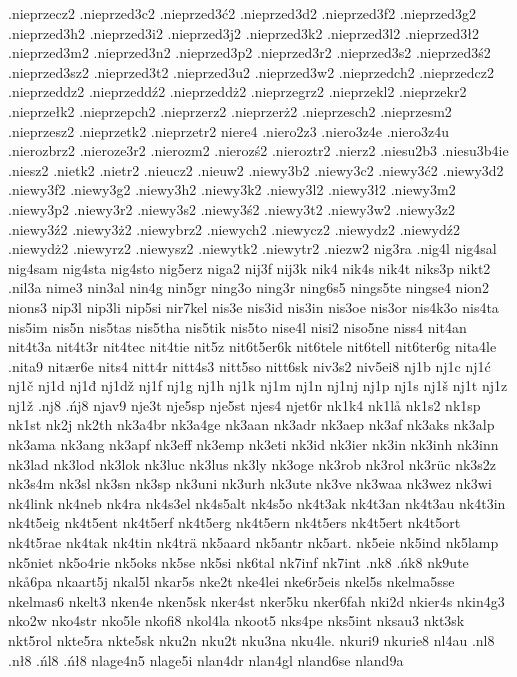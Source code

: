 {{.nieprzecz2
.nieprzed3c2
.nieprzed3ć2
.nieprzed3d2
.nieprzed3f2
.nieprzed3g2
.nieprzed3h2
.nieprzed3i2
.nieprzed3j2
.nieprzed3k2
.nieprzed3l2
.nieprzed3ł2
.nieprzed3m2
.nieprzed3n2
.nieprzed3p2
.nieprzed3r2
.nieprzed3s2
.nieprzed3ś2
.nieprzed3sz2
.nieprzed3t2
.nieprzed3u2
.nieprzed3w2
.nieprzedch2
.nieprzedcz2
.nieprzeddz2
.nieprzeddź2
.nieprzeddż2
.nieprzegrz2
.nieprzekl2
.nieprzekr2
.nieprzełk2
.nieprzepch2
.nieprzerz2
.nieprzerż2
.nieprzesch2
.nieprzesm2
.nieprzesz2
.nieprzetk2
.nieprzetr2
niere4
.niero2z3
.niero3z4e
.niero3z4u
.nierozbrz2
.nieroze3r2
.nierozm2
.nierozś2
.nieroztr2
.nierz2
.niesu2b3
.niesu3b4ie
.niesz2
.nietk2
.nietr2
.nieucz2
.nieuw2
.niewy3b2
.niewy3c2
.niewy3ć2
.niewy3d2
.niewy3f2
.niewy3g2
.niewy3h2
.niewy3k2
.niewy3l2
.niewy3ł2
.niewy3m2
.niewy3p2
.niewy3r2
.niewy3s2
.niewy3ś2
.niewy3t2
.niewy3w2
.niewy3z2
.niewy3ź2
.niewy3ż2
.niewybrz2
.niewych2
.niewycz2
.niewydz2
.niewydź2
.niewydż2
.niewyrz2
.niewysz2
.niewytk2
.niewytr2
.niezw2
nig3ra
.nig4l
nig4sal
nig4sam
nig4sta
nig4sto
nig5erz
niga2
nij3f
nij3k
nik4
nik4s
nik4t
niks3p
nikt2
.nil3a
nime3
nin3al
nin4g
nin5gr
ning3o
ning3r
ning6s5
nings5te
ningse4
nion2
nions3
nip3l
nip3li
nip5si
nir7kel
nis3e
nis3id
nis3in
nis3oe
nis3or
nis4k3o
nis4ta
nis5im
nis5n
nis5tas
nis5tha
nis5tik
nis5to
nise4l
nisi2
niso5ne
niss4
nit4an
nit4t3a
nit4t3r
nit4tec
nit4tie
nit5z
nit6t5er6k
nit6tele
nit6tell
nit6ter6g
nita4le
.nita9
nitær6e
nits4
nitt4r
nitt4s3
nitt5so
nitt6sk
niv3s2
niv5ei8
nj1b
nj1c
nj1ć
nj1č
nj1d
nj1đ
nj1dž
nj1f
nj1g
nj1h
nj1k
nj1m
nj1n
nj1nj
nj1p
nj1s
nj1š
nj1t
nj1z
nj1ž
.nj8
.ńj8
njav9
nje3t
nje5sp
nje5st
njes4
njet6r
nk1k4
nk1lå
nk1s2
nk1sp
nk1st
nk2j
nk2th
nk3a4br
nk3a4ge
nk3aan
nk3adr
nk3aep
nk3af
nk3aks
nk3alp
nk3ama
nk3ang
nk3apf
nk3eff
nk3emp
nk3eti
nk3id
nk3ier
nk3in
nk3inh
nk3inn
nk3lad
nk3lod
nk3lok
nk3luc
nk3lus
nk3ly
nk3oge
nk3rob
nk3rol
nk3rüc
nk3s2z
nk3s4m
nk3sl
nk3sn
nk3sp
nk3uni
nk3urh
nk3ute
nk3ve
nk3waa
nk3wez
nk3wi
nk4link
nk4neb
nk4ra
nk4s3el
nk4s5alt
nk4s5o
nk4t3ak
nk4t3an
nk4t3au
nk4t3in
nk4t5eig
nk4t5ent
nk4t5erf
nk4t5erg
nk4t5ern
nk4t5ers
nk4t5ert
nk4t5ort
nk4t5rae
nk4tak
nk4tin
nk4trä
nk5aard
nk5antr
nk5art.
nk5eie
nk5ind
nk5lamp
nk5niet
nk5o4rie
nk5oks
nk5se
nk5si
nk6tal
nk7inf
nk7int
.nk8
.ńk8
nk9ute
nkå6pa
nkaart5j
nkal5l
nkar5s
nke2t
nke4lei
nke6r5eis
nkel5s
nkelma5sse
nkelmas6
nkelt3
nken4e
nken5sk
nker4st
nker5ku
nker6fah
nki2d
nkier4s
nkin4g3
nko2w
nko4str
nko5le
nkofi8
nkol4la
nkoot5
nks4pe
nks5int
nksau3
nkt3sk
nkt5rol
nkte5ra
nkte5sk
nku2n
nku2t
nku3na
nku4le.
nkuri9
nkurie8
nl4au
.nl8
.nł8
.ńl8
.ńł8
nlage4n5
nlage5i
nlan4dr
nlan4gl
nland6se
nland9a
}}
